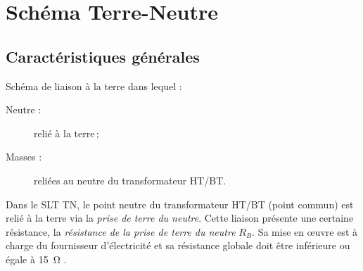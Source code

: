 

\begin{comment}

\documentclass[a4paper, 11pt, twoside, fleqn]{memoir}

\usepackage{AOCDTF}

\marqueurchapitre
\decoupagechapitre{1} %


	\openleft %

\end{comment}

\chapter{Schéma Terre-Neutre\label{chap:schema_tn}}
\ChapFrame

\section{Caractéristiques générales}

\begin{definition}[Schéma TN]
Schéma de liaison à la terre dans lequel :
\begin{description}
\item[Neutre :] relié à la terre\,;
\item[Masses :] reliées au neutre du transformateur HT/BT.
\end{description}
\end{definition}

Dans le SLT TN, le point neutre du transformateur HT/BT (point commun) est relié à la terre via la \emph{prise de terre du neutre}. Cette liaison présente une certaine résistance, la \emph{résistance de la prise de terre du neutre} $R_B$. Sa mise en \oe{}uvre est à charge du fournisseur d'électricité et sa résistance globale doit être inférieure ou égale à \SI{15}{\ohm} \supercite{NF:C13-100-2015}.\\

